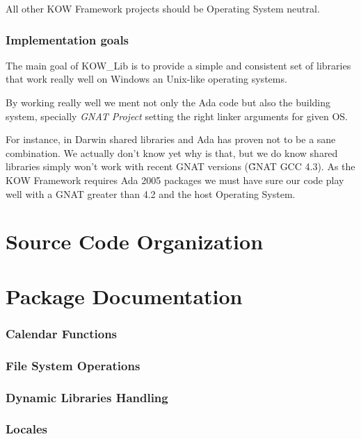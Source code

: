 \documentclass[english,letterpaper]{book}
\begin{document}
All other KOW Framework projects should be Operating System neutral.



\subsection{Implementation goals}
The main goal of KOW\_Lib is to provide a simple and consistent set of libraries that
work really well on Windows an Unix-like operating systems.

By working really well we ment not only the Ada code but also the building system,
specially \emph{GNAT Project} setting the right linker arguments for given OS.

For instance, in Darwin shared libraries and Ada has proven not to be a sane
combination. We actually don't know yet why is that, but we do know shared libraries
simply won't work with recent GNAT versions (\~GNAT GCC 4.3). As the KOW Framework
requires Ada 2005 packages we must have sure our code play well with a GNAT
greater than 4.2 and the host Operating System.


\chapter{Source Code Organization}
\label{source_organization}

\chapter{Package Documentation}
\label{api}

\subsection{Calendar Functions}
\label{api:calendar}


\subsection{File System Operations}
\label{api:file_system}

\subsection{Dynamic Libraries Handling}
\label{api:libraries}

\subsection{Locales}
\label{api:locales}
\end{document}
